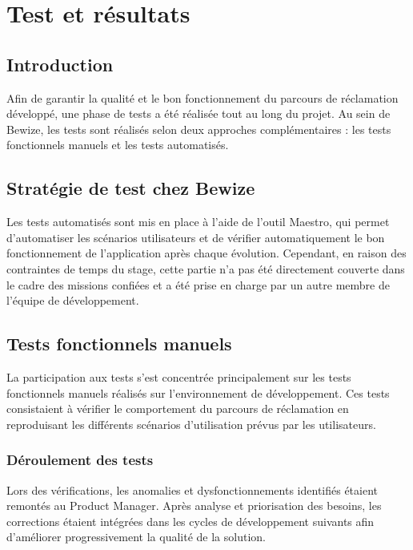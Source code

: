 \chapter{Test et résultats}

\section{Introduction}
Afin de garantir la qualité et le bon fonctionnement du parcours de 
réclamation développé, une phase de tests a été réalisée tout au long 
du projet. Au sein de Bewize, les tests sont réalisés selon deux 
approches complémentaires : les tests fonctionnels manuels et les 
tests automatisés.

\section{Stratégie de test chez Bewize}

Les tests automatisés sont mis en place à l'aide de l'outil Maestro, 
qui permet d'automatiser les scénarios utilisateurs et de vérifier 
automatiquement le bon fonctionnement de l'application après chaque 
évolution. Cependant, en raison des contraintes de temps du stage, 
cette partie n'a pas été directement couverte dans le cadre des 
missions confiées et a été prise en charge par un autre membre de 
l'équipe de développement.

\section{Tests fonctionnels manuels}

La participation aux tests s'est concentrée principalement sur les 
tests fonctionnels manuels réalisés sur l'environnement de développement. 
Ces tests consistaient à vérifier le comportement du parcours de 
réclamation en reproduisant les différents scénarios d'utilisation 
prévus par les utilisateurs.

\subsection{Déroulement des tests}
Lors des vérifications, les anomalies et dysfonctionnements identifiés 
étaient remontés au Product Manager. Après analyse et priorisation 
des besoins, les corrections étaient intégrées dans les cycles de 
développement suivants afin d'améliorer progressivement la qualité 
de la solution.

